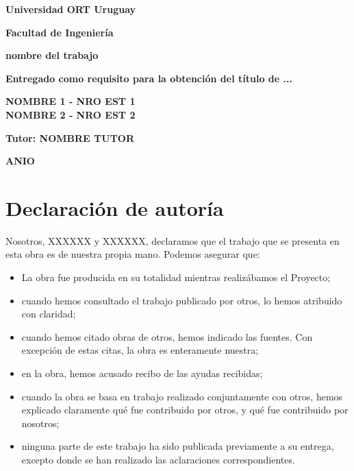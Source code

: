 \documentclass[12pt,a4paper,oneside]{book}
\begin{document}
\vspace*{\fill}

\begin{center}

\begin{Large}
\textbf{Universidad ORT Uruguay}

\textbf{Facultad de Ingeniería}
\vspace{5cm}
\end{Large}

\begin{huge}
\textbf{nombre del trabajo}
\end{huge} 

\vspace{1cm}

\textbf{Entregado como requisito para la obtención del título de ...}
\vspace{2cm}

\begin{Large}
\textbf{NOMBRE 1 - NRO EST 1}\\
\textbf{NOMBRE 2 - NRO EST 2}\\
\vspace{2cm}

\textbf{Tutor: NOMBRE TUTOR}
\vspace{2cm}
\end{Large}

\begin{large}
\textbf{ANIO}
\end{large}

\end{center}
\vspace*{\fill}

\thispagestyle{empty}
\newpage




\chapter*{Declaración de autoría}




Nosotros, XXXXXX y XXXXXX, declaramos que el trabajo que se presenta en esta obra es de nuestra
propia mano. Podemos asegurar que:
\begin{itemize}
\item La obra fue producida en su totalidad mientras realizábamos el Proyecto;
\item cuando hemos consultado el trabajo publicado por otros, lo hemos atribuido con claridad;
\item cuando hemos citado obras de otros, hemos indicado las fuentes. Con excepción de estas citas, la obra es enteramente nuestra;
\item en la obra, hemos acusado recibo de las ayudas recibidas;
\item cuando la obra se basa en trabajo realizado conjuntamente con otros, hemos explicado claramente qué fue contribuido por otros, y qué fue contribuido por nosotros;
\item ninguna parte de este trabajo ha sido publicada previamente a su entrega, excepto donde se han realizado las aclaraciones correspondientes.
\end{itemize}
\end{document}
